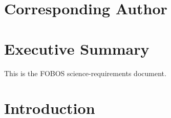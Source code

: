 \documentclass[11pt,a4paper,twoside,onecolumn,openany,final,oldfontcommands]{memoir}
\begin{document}
%
%


\frontmatter

\thispagestyle{empty}  %

\clearpage
\setupmaintoc
\tableofcontents 

\clearpage
\listoffigures

\chapter{Corresponding Author}
%



\chapter{Executive Summary}

This is the FOBOS science-requirements document.



\mainmatter

\chapter{Introduction}
\end{document}
